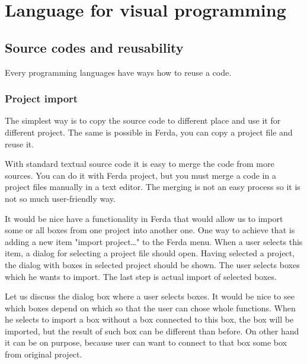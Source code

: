 \documentclass[a4paper,12pt]{book}
\begin{document}

\chapter{Language for visual programming}
\section{Source codes and reusability}
Every programming languages have ways how to reuse a code. 

\subsection{Project import}
The simplest way is to copy the source code to different place and use it for different project. The same is possible in Ferda, you can copy a project file and reuse it.

With standard textual source code it is easy to merge the code from more sources. You can do it with Ferda project, but you must merge a code in a project files manually in a text editor. The merging is not an easy process so it is not so much user-friendly way.

It would be nice have a functionality in Ferda that would allow us to import some or all boxes from one project into another one. One way to achieve that is adding a new item "import project\dots" to the Ferda menu. When a user selects this item, a dialog for selecting a project file should open. Having selected a project, the dialog with boxes in selected project should be shown. The user selects boxes which he wants to import. The last step is actual import of selected boxes.

Let us discuss the dialog box where a user selects boxes. It would be nice to see which boxes depend on which so that the user can chose whole functions. When he selects to import a box without a box connected to this box, the box will be imported, but the result of such box can be different than before. On other hand it can be on purpose, because user can want to connect to that box some box from original project.
\end{document}
